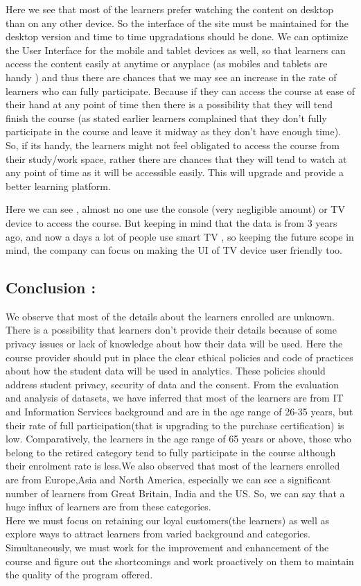 \documentclass[
]{article}
\begin{document}
Here we see that most of the learners prefer watching the content on
desktop than on any other device. So the interface of the site must be
maintained for the desktop version and time to time upgradations should
be done. We can optimize the User Interface for the mobile and tablet
devices as well, so that learners can access the content easily at
anytime or anyplace (as mobiles and tablets are handy ) and thus there
are chances that we may see an increase in the rate of learners who can
fully participate. Because if they can access the course at ease of
their hand at any point of time then there is a possibility that they
will tend finish the course (as stated earlier learners complained that
they don't fully participate in the course and leave it midway as they
don't have enough time). So, if its handy, the learners might not feel
obligated to access the course from their study/work space, rather there
are chances that they will tend to watch at any point of time as it will
be accessible easily. This will upgrade and provide a better learning
platform.

Here we can see , almost no one use the console (very negligible amount)
or TV device to access the course. But keeping in mind that the data is
from 3 years ago, and now a days a lot of people use smart TV , so
keeping the future scope in mind, the company can focus on making the UI
of TV device user friendly too.

\hypertarget{conclusion}{%
\subsection{Conclusion :}\label{conclusion}}

We observe that most of the details about the learners enrolled are
unknown. There is a possibility that learners don't provide their
details because of some privacy issues or lack of knowledge about how
their data will be used. Here the course provider should put in place
the clear ethical policies and code of practices about how the student
data will be used in analytics. These policies should address student
privacy, security of data and the consent. From the evaluation and
analysis of datasets, we have inferred that most of the learners are
from IT and Information Services background and are in the age range of
26-35 years, but their rate of full participation(that is upgrading to
the purchase certification) is low. Comparatively, the learners in the
age range of 65 years or above, those who belong to the retired category
tend to fully participate in the course although their enrolment rate is
less.We also observed that most of the learners enrolled are from
Europe,Asia and North America, especially we can see a significant
number of learners from Great Britain, India and the US. So, we can say
that a huge influx of learners are from these categories.\\
Here we must focus on retaining our loyal customers(the learners) as
well as explore ways to attract learners from varied background and
categories. Simultaneously, we must work for the improvement and
enhancement of the course and figure out the shortcomings and work
proactively on them to maintain the quality of the program offered.
\end{document}
